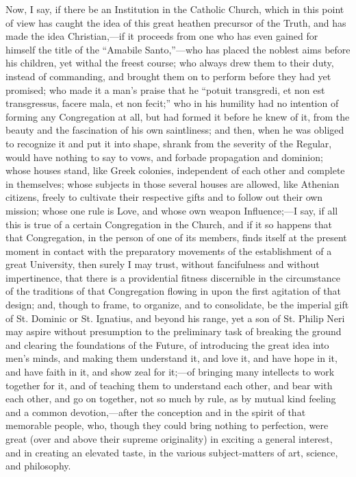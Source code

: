 Now, I say, if there be an Institution in the Catholic Church,
which in this point of view has caught the idea of this great heathen
precursor of the Truth, and has made the idea Christian,—if it
proceeds from one who has even gained for himself the title of the
``Amabile Santo,''—who has placed the noblest aims before
his children, yet withal the freest course; who always drew them to
their duty, instead of commanding, and brought them on to perform
before they had yet promised; who made it a man's praise that he
``potuit transgredi, et non est transgressus, facere mala, et non
fecit;'' who in his humility had no intention of forming any
Congregation at all, but had formed it before he knew of it, from the
beauty and the fascination of his own saintliness; and then, when he
was obliged to recognize it and put it into shape, shrank from the
severity of the Regular, would have nothing to say to vows, and
forbade propagation and dominion; whose houses stand, like Greek
colonies, independent of each other and complete in themselves; whose
subjects in those several houses are allowed, like Athenian citizens,
freely to cultivate their respective gifts and to follow out their own
mission; whose one rule is Love, and whose own weapon Influence;—I
say, if all this is true of a certain Congregation in the Church, and
if it so happens that that Congregation, in the person of one of its
members, finds itself at the present moment in contact with the
preparatory movements of the establishment of a great University,
then surely I may trust, without fancifulness and without
impertinence, that there is a providential fitness discernible in the
circumstance of the traditions of that Congregation flowing in upon
the first agitation of that design; and, though to frame, to organize,
and to consolidate, be the imperial gift of St. Dominic or St.
Ignatius, and beyond his range, yet a son of St. Philip Neri may
aspire without presumption to the preliminary task of breaking the
ground and clearing the foundations of the Future, of introducing the
great idea into men's minds, and making them understand it, and love
it, and have hope in it, and have faith in it, and show zeal for it;—of
bringing many intellects to work together for it, and of teaching them
to understand each other, and bear with each other, and go on
together, not so much by rule, as by mutual kind feeling and a common
devotion,—after the conception and in the spirit of that memorable
people, who, though they could bring nothing to perfection, were great
(over and above their supreme originality) in exciting a general
interest, and in creating an elevated taste, in the various
subject-matters of art, science, and philosophy.


